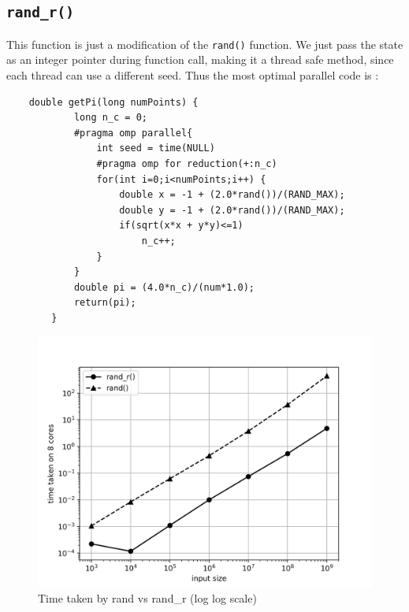 \documentclass[12,a4paper]{article}
\def\code#1{\texttt{#1}}
\begin{document}
{    \subsection{\code{rand\_r()}}
    This function is just a modification of the \code{rand()} function. We just pass the state as an integer pointer during function call, making it a thread safe method, since each thread can use a different seed.
    Thus the most optimal parallel code is :
    \begin{lstlisting}
    double getPi(long numPoints) {
            long n_c = 0;
            #pragma omp parallel{
                int seed = time(NULL)
                #pragma omp for reduction(+:n_c)
                for(int i=0;i<numPoints;i++) {
                    double x = -1 + (2.0*rand())/(RAND_MAX);
                    double y = -1 + (2.0*rand())/(RAND_MAX);
                    if(sqrt(x*x + y*y)<=1)
                        n_c++;
                }
            }
            double pi = (4.0*n_c)/(num*1.0);
            return(pi);
        }
    \end{lstlisting}
    \begin{figure}[H]
        \centering
        \includegraphics[width=\textwidth]{rand_rand_r.png}
        \caption{Time taken by rand vs rand\_r (log log scale)}
        \label{fig:q1p7}
    \end{figure}
}
\end{document}
